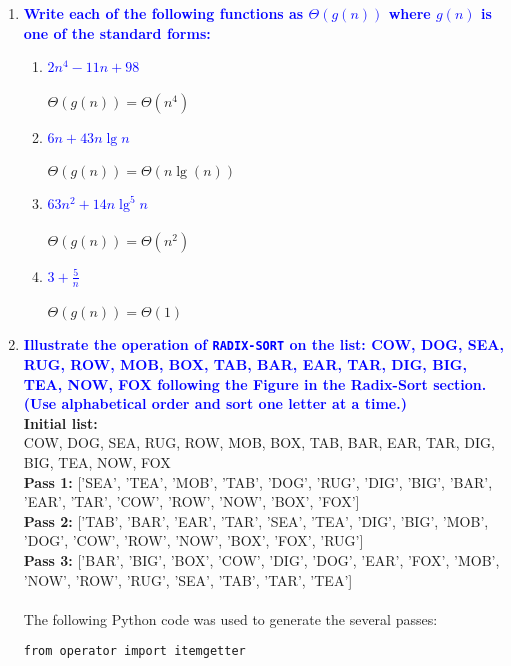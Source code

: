 \documentclass{article}
\begin{document}
    

\begin{enumerate}
\item \textbf{\textcolor{blue}{Write each of the following functions as $\Theta(g(n))$ where $g(n)$ is one of the standard forms:}}
    \begin{enumerate}
    \item \textbf{\textcolor{blue}{$2n^4-11n+98$}}
        \\\\ $\Theta(g(n)) = \Theta(n^4)$ \\
    \item \textbf{\textcolor{blue}{$6n + 43n\lg n$}}
        \\\\ $\Theta(g(n)) = \Theta(n\lg(n))$ \\
    \item \textbf{\textcolor{blue}{$63n^2 + 14n\lg^5n$}}
        \\\\ $\Theta(g(n)) = \Theta(n^2)$ \\
    \item \textbf{\textcolor{blue}{$3 + \frac{5}{n}$}}
        \\\\ $\Theta(g(n)) = \Theta(1)$ \\
    \end{enumerate}

\item \textbf{\textcolor{blue}{Illustrate the operation of {\tt RADIX-SORT} on the list: COW, DOG, SEA, RUG, ROW, MOB, BOX, TAB, BAR, EAR, TAR, DIG, BIG, TEA, NOW, FOX following the Figure in the Radix-Sort section. (Use alphabetical order and sort one letter at a time.)}} 
    \\ \textbf{Initial list:}
    \\ COW, DOG, SEA, RUG, ROW, MOB, BOX, TAB, BAR, EAR, TAR, DIG, BIG, TEA, NOW, FOX
    \\ \textbf{Pass 1:} ['SEA', 'TEA', 'MOB', 'TAB', 'DOG', 'RUG', 'DIG', 'BIG', 'BAR', 'EAR', 'TAR', 'COW', 'ROW', 'NOW', 'BOX', 'FOX']
    \\ \textbf{Pass 2:} ['TAB', 'BAR', 'EAR', 'TAR', 'SEA', 'TEA', 'DIG', 'BIG', 'MOB', 'DOG', 'COW', 'ROW', 'NOW', 'BOX', 'FOX', 'RUG']
    \\ \textbf{Pass 3:} ['BAR', 'BIG', 'BOX', 'COW', 'DIG', 'DOG', 'EAR', 'FOX', 'MOB', 'NOW', 'ROW', 'RUG', 'SEA', 'TAB', 'TAR', 'TEA']
    \\\\ The following Python code was used to generate the several passes:
    \begin{verbatim}
from operator import itemgetter
             

\end{verbatim}
\end{enumerate}
\end{document}
